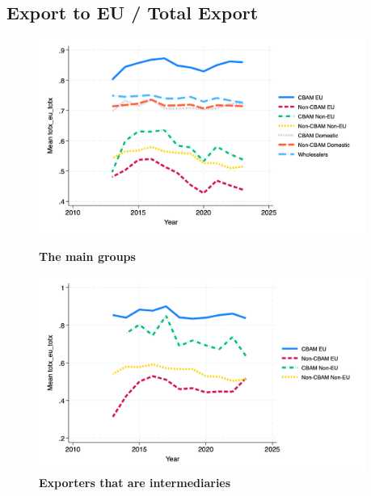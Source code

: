 \documentclass{article}
\begin{document}
\subsection{Export to EU / Total Export}
\begin{figure}[H]
\centering
\includegraphics[width=0.95\textwidth]{totx_eu_totx_main_groups.png}
\caption{\textbf{The main groups}}
\includegraphics[width=0.95\textwidth]{totx_eu_totx_ei.png}
\caption{\textbf{Exporters that are intermediaries}}
\end{figure}
\end{document}
